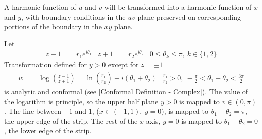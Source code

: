 \documentclass[12pt, english]{book}
\begin{document}
	A harmonic function of \(u\) and \(v\) will be transformed into a harmonic function of \(x\) and \(y\), with boundary conditions in the \(uv\) plane preserved on corresponding portions of the boundary in the \(xy\) plane.
	
	Let 
	\begin{align*}
		z - 1 &= r_1 e^{i\theta_1} & 
		z + 1 &= r_2 e^{i\theta_2} &
		0 \leq \theta_k \leq \pi, \ k \in \{1, 2\}
	\end{align*}
	Transformation defined for \(y > 0\) except for \(z = \pm 1\)
	\begin{align*}
		w &= \log(\frac{z-1}{z+1}) = \ln(\frac{r_1}{r_2}) + i(\theta_1 + \theta_2) &
		\frac{r_1}{r_2} > 0, \ -\frac{\pi}{2} < \theta_1 - \theta_2 < \frac{3\pi}{2}
	\end{align*}
	is analytic and conformal (see \cref{Conformal Definition - Complex}).
	The value of the logarithm is principle, so the upper half plane \(y > 0\) is mapped to \(v \in (0, \pi)\). The line between \(-1\) and \(1\), (\(x \in (-1, 1), \ y=0\)), is mapped to \(\theta_1 - \theta_2 = \pi\), the upper edge of the strip. The rest of the \(x\) axis, \(y = 0\) is mapped to \(\theta_1 - \theta_2 = 0\), the lower edge of the strip.
	
\end{document}
